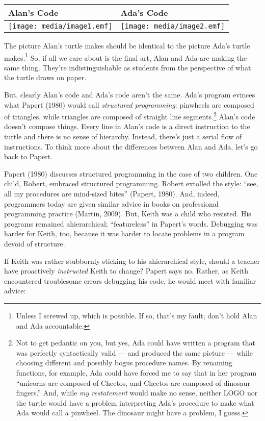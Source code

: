 \begin{longtable}[]{@{}ll@{}}
\toprule
Alan's Code & Ada's Code\tabularnewline
\midrule
\endhead
\texttt{[image: media/image1.emf]} &
\texttt{[image: media/image2.emf]}\tabularnewline
\bottomrule
\end{longtable}

The picture Alan's turtle makes should be identical to the picture Ada's
turtle makes.\footnote{Unless I screwed up, which is possible. If so,
  that's my fault; don't hold Alan and Ada accountable.} So, if all we
care about is the final art, Alan and Ada are making the same thing.
They're indistinguishable as students from the perspective of what the
turtle draws on paper.

But, clearly Alan's code and Ada's code aren't the same. Ada's program
evinces what Papert (1980) would call \emph{structured programming}:
pinwheels are composed of triangles, while triangles are composed of
straight line segments.\footnote{Not to get pedantic on you, but yes,
  Ada could have written a program that was perfectly syntactically
  valid --- and produced the same picture --- while choosing different
  and possibly bogus procedure names. By renaming functions, for
  example, Ada could have forced me to say that in her program
  ``unicorns are composed of Cheetos, and Cheetos are composed of
  dinosaur fingers.'' And, while \emph{my restatement} would make no
  sense, neither LOGO nor the turtle would have a problem interpreting
  Ada's procedure to make what Ada would call a pinwheel. The dinosaur
  might have a problem, I guess.} Alan's code doesn't compose things.
Every line in Alan's code is a direct instruction to the turtle and
there is no sense of hierarchy. Instead, there's just a serial flow of
instructions. To think more about the differences between Alan and Ada,
let's go back to Papert.

Papert (1980) discusses structured programming in the case of two
children. One child, Robert, embraced structured programming. Robert
extolled the style: ``see, all my procedures are mind-sized bites''
(Papert, 1980). And, indeed, programmers today are given similar advice
in books on professional programming practice (Martin, 2009). But, Keith
was a child who resisted. His programs remained ahierarchical;
``featureless'' in Papert's words. Debugging was harder for Keith, too,
because it was harder to locate problems in a program devoid of
structure.

If Keith was rather stubbornly sticking to his ahierarchical style,
should a teacher have proactively \emph{instructed} Keith to change?
Papert says no. Rather, as Keith encountered troublesome errors
debugging his code, he would meet with familiar advice:

